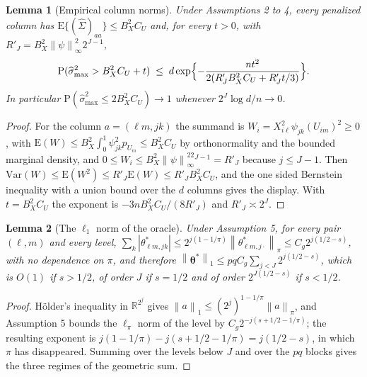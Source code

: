 \documentclass[10pt]{book}
\newtheorem{lemma}{Lemma}[section]
\theoremstyle{definition}
\newcommand{\R}{\mathbb{R}}
\newcommand{\E}{\mathrm{E}}
\newcommand{\Prob}{\mathrm{P}}
\newcommand{\Var}{\mathrm{Var}}
\newcommand{\norm}[1]{\left\lVert #1 \right\rVert}
\newcommand{\cv}{\ell}
\newcommand{\md}{m}
\newcommand{\lev}{j}
\newcommand{\tsl}{k}
\newcommand{\wav}[2]{\psi_{#1#2}}
\newcommand{\coefs}[4]{\theta^{*}_{#1#2,#3#4}}
\newcommand{\btheta}{\boldsymbol{\theta}}
\newcommand{\thetastar}{\btheta^{*}}
\newcommand{\Gramhat}{\widehat{\Sigma}}
\newcommand{\smax}{\widehat{\sigma}_{\max}}
\begin{document}
\begin{lemma}[Empirical column norms]
\label{lem:columns}
Under Assumptions 2 to 4, every penalized column has
$\E\{(\Gramhat)_{aa}\} \le B_X^2C_U$ and, for every $t>0$, with
$R'_J = B_X^2\norm{\psi}^2_{\infty}2^{J-1}$,
\[
  \Prob(\smax^2 > B_X^2C_U+t) \;\le\;
  d\exp\Bigl\{-\frac{nt^2}{2(R'_JB_X^2C_U+R'_Jt/3)}\Bigr\} .
\]
In particular $\Prob(\smax^2 \le 2B_X^2C_U) \to 1$ whenever
$2^J\log d/n \to 0$.
\end{lemma}

\begin{proof}
For the column $a = (\cv\md,\lev\tsl)$ the summand is
$W_i = X_{i\cv}^2\wav{\lev}{\tsl}(U_{i\md})^2 \ge 0$, with
$\E(W) \le B_X^2\int_0^1\wav{\lev}{\tsl}^2p_{U_{\md}} \le B_X^2C_U$ by
orthonormality and the bounded marginal density, and
$0 \le W_i \le B_X^2\norm{\psi}_{\infty}^22^{J-1} = R'_J$ because
$\lev \le J-1$. Then $\Var(W) \le \E(W^2) \le R'_J\E(W) \le R'_JB_X^2C_U$, and
the one sided Bernstein inequality with a union bound over the $d$ columns
gives the display. With $t = B_X^2C_U$ the exponent is
$-3nB_X^2C_U/(8R'_J)$ and $R'_J \asymp 2^J$.
\end{proof}

\begin{lemma}[The $\ell_1$ norm of the \textcolor{colR1}{oracle}]
\label{lem:l1}
Under Assumption 5, for every pair $(\cv,\md)$ and every level,
$\sum_{\tsl}|\coefs{\cv}{\md}{\lev}{\tsl}| \le
2^{\lev(1-1/\pi)}\norm{\theta^{*}_{\cv\md,\lev\cdot}}_{\pi} \le
C_g2^{\lev(1/2-s)}$, with no dependence on $\pi$, and therefore
$\norm{\thetastar}_1 \le pqC_g\sum_{\lev<J}2^{\lev(1/2-s)}$, which is
$O(1)$ if $s>1/2$, of order $J$ if $s = 1/2$ and of order
$2^{J(1/2-s)}$ if $s<1/2$.
\end{lemma}

\begin{proof}
Hölder's inequality in $\R^{2^{\lev}}$ gives
$\norm{a}_1 \le (2^{\lev})^{1-1/\pi}\norm{a}_{\pi}$, and Assumption 5 bounds
the $\ell_\pi$ norm of the level by $C_g2^{-\lev(s+1/2-1/\pi)}$; the resulting
exponent is $\lev(1-1/\pi)-\lev(s+1/2-1/\pi) = \lev(1/2-s)$, in which $\pi$
has disappeared. Summing over the levels below $J$ and over the $pq$ blocks
gives the three regimes of the geometric sum.
\end{proof}
\end{document}
